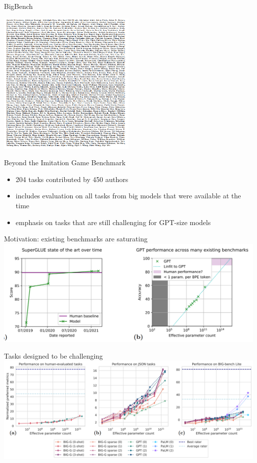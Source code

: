 \begin{vbframe}{BigBench}

	\includegraphics[width=0.5\textwidth]{evaluation_figures/bigbench_authors.png}

	Beyond the Imitation Game Benchmark
\begin{itemize}
	\item 204 tasks contributed by 450 authors
	\item includes evaluation on all tasks from big models that were available at the time
	\item emphasis on tasks that are still challenging for GPT-size models
\end{itemize}
\end{vbframe}

\begin{vbframe}{Motivation: existing benchmarks are saturating}
	\vfill
	\includegraphics[width=\textwidth]{evaluation_figures/bigbench_motivation.png}
	\vfill
\end{vbframe}

\begin{vbframe}{Tasks designed to be challenging}
	\vfill
	\includegraphics[width=\textwidth]{evaluation_figures/bigbench_challenging.png}
	\vfill
\end{vbframe}

